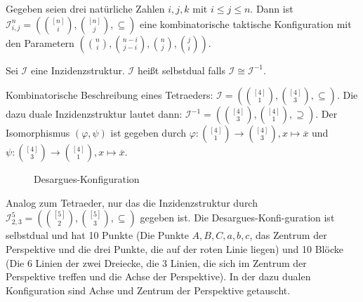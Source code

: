 \documentclass{article}
\begin{document}
\begin{definition}
  Gegeben seien drei natürliche Zahlen $i, j, k$ mit $i \leq j \leq n$.
  Dann ist ${\mathcal{I}^n_{i, j} = (\binom{[n]}{i}, \binom{[n]}{j}, \subseteq)}$ eine kombinatorische taktische Konfiguration
  mit den Parametern $(\binom{n}{i}, \binom{n - i}{j - i}, \binom{n}{j}, \binom{j}{i})$.
\end{definition}

\begin{definition}
  Sei $\mathcal{I}$ eine Inzidenzstruktur.
  $\mathcal{I}$ heißt selbstdual falls $\mathcal{I} \cong \mathcal{I}^{-1}$.
\end{definition}

\begin{sloppypar}
  \begin{example}[Tetraeder]
    Kombinatorische Beschreibung eines Tetraeders: ${\mathcal{I} =  (\binom{[4]}{1}, \binom{[4]}{3}, \subseteq)}$.
    Die dazu duale Inzidenzstruktur lautet dann: ${\mathcal{I}^{-1} = (\binom{[4]}{3}, \binom{[4]}{1}, \supseteq)}$.
    Der Isomorphismus  $(\varphi, \psi)$ ist gegeben durch
    ${\varphi \colon \binom{[4]}{1} \to \binom{[4]}{3}, x \mapsto \overline{x}}$ und
    ${\psi \colon \binom{[4]}{3} \to \binom{[4]}{1}, x \mapsto \overline{x}}$.
  \end{example}
\end{sloppypar}

\begin{example}
  \begin{figure}
    \caption{Desargues-Konfiguration}
    \label{fig:Desargues}
  \end{figure}

  Analog zum Tetraeder, nur das die Inzidenzstruktur durch ${\mathcal{I}^5_{2, 3} = (\binom{[5]}{2}, \binom{[5]}{3}, \subseteq)}$ gegeben ist.
  Die Desargues-Konfi-guration ist selbstdual und hat 10 Punkte (Die Punkte $A, B, C, a, b, c$, das Zentrum der Perspektive und die drei Punkte, die auf der roten Linie liegen)
  und 10 Blöcke (Die 6 Linien der zwei Dreiecke, die 3 Linien, die sich im Zentrum der Perspektive treffen und die Achse der Perspektive).
  In der dazu dualen Konfiguration sind Achse und Zentrum der Perspektive getauscht.
\end{example}
\end{document}
